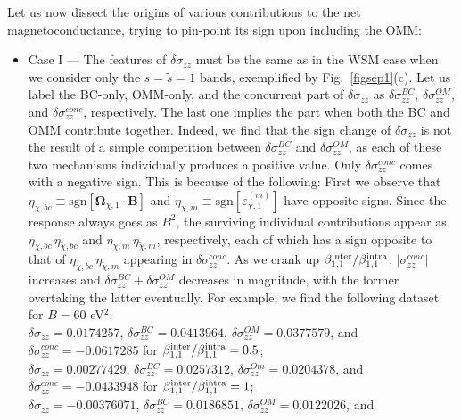 \documentclass[aps,prb,onecolumn,nofootinbib,citeautoscript,10pt]{revtex4-2}
\begin{document}
Let us now dissect the origins of various contributions to the net magnetoconductance, trying to pin-point its sign upon including the OMM:
\begin{itemize}
\item Case I --- The features of $\delta \sigma_{zz}$ must be the same as in the WSM case when we consider only the $s = \tilde s = 1$ bands, exemplified by Fig.~\ref{figsep1}(c). Let us label the BC-only, OMM-only, and the concurrent part of $ \delta \sigma_{zz} $ as $ \delta \sigma_{zz}^{BC}$, $\delta \sigma_{zz}^{OM}$, and $ \delta \sigma_{zz}^{conc}$, respectively. The last one implies the part when both the BC and OMM contribute together. Indeed, we find that the sign change of $\delta \sigma_{zz}$ is not the result of a simple competition between $ \delta \sigma_{zz}^{BC}$ and $ \delta \sigma_{zz}^{OM}$, as each of these two mechanisms individually produces a positive value. Only $ \delta \sigma_{zz}^{conc}$ comes with a negative sign. This is because  of the following: First we observe that $\eta_{\chi, bc} \equiv \text{sgn}[\boldsymbol \Omega_{\chi,1}  \cdot \boldsymbol B ]  $ and $\eta_{\chi, m} \equiv \text{sgn}[\varepsilon_{\chi, 1}^{(m)} ] $ have opposite signs. Since the response always goes as $B^2$, the surviving individual contributions appear as $\eta_{\chi, bc}\, \eta_{\tilde \chi, bc} $ and $\eta _{\chi ,m} \, \eta_{\tilde{\chi}, m}$, respectively, each of which has a sign opposite to that of $ \eta_{\chi, bc} \, \eta_{\tilde \chi , m} $ appearing in $ \delta \sigma_{zz}^{conc}$. As we crank up $ \beta^{\rm inter}_{1,1} / \beta^{\rm intra}_{1,1} $, $ |  \sigma_{zz}^{conc} |$ increases and $  \delta\sigma_{zz}^{BC} + \delta\sigma_{zz}^{OM}$ decreases in magnitude, with the former overtaking the latter eventually. For example, we find the following dataset for $B = 60 $ eV$^2$:
\\$ \delta \sigma_{zz} = 0.0174257 $, $ \delta \sigma_{zz}^{BC}  = 0.0413964 $,  
$\delta \sigma_{zz}^{OM}  =  0.0377579 $, and
$\delta \sigma_{zz}^{conc} = -0.0617285$ for $\beta^{\rm inter}_{1,1} / \beta^{\rm intra}_{1,1} = 0.5$;
\\$ \delta \sigma_{zz} = 0.00277429 $, $\delta \sigma_{zz}^{BC} = 0.0257312 $,  
$\delta \sigma_{zz}^{Om}  = 0.0204378 $, and
$\delta\sigma_{zz}^{conc}  = -0.0433948 $ for $\beta^{\rm inter}_{1,1} / \beta^{\rm intra}_{1,1} = 1 $;
\\$ \delta \sigma_{zz} = -0.00376071 $, $\delta \sigma_{zz}^{BC} = 0.0186851 $,  
$ \delta \sigma_{zz}^{OM}  = 0.0122026 $, and

\end{itemize}
\end{document}
